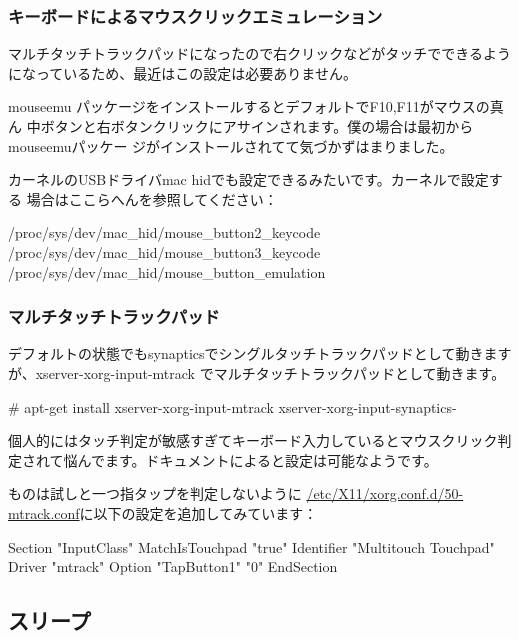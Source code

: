 \documentclass[mingoth,a4paper]{jsarticle}
\begin{document}
\subsubsection{キーボードによるマウスクリックエミュレーション}

マルチタッチトラックパッドになったので右クリックなどがタッチでできるよう
になっているため、最近はこの設定は必要ありません。

mouseemu パッケージをインストールするとデフォルトでF10,F11がマウスの真ん
中ボタンと右ボタンクリックにアサインされます。僕の場合は最初からmouseemuパッケー
ジがインストールされてて気づかずはまりました。

カーネルのUSBドライバmac hidでも設定できるみたいです。カーネルで設定する
場合はここらへんを参照してください：
\begin{commandline}
/proc/sys/dev/mac_hid/mouse_button2_keycode
/proc/sys/dev/mac_hid/mouse_button3_keycode  
/proc/sys/dev/mac_hid/mouse_button_emulation
\end{commandline}

\subsubsection{マルチタッチトラックパッド}

デフォルトの状態でもsynapticsでシングルタッチトラックパッドとして動きますが、xserver-xorg-input-mtrack でマルチタッチトラックパッドとして動きます。 

 \begin{commandline}
# apt-get install xserver-xorg-input-mtrack xserver-xorg-input-synaptics-
 \end{commandline}

個人的にはタッチ判定が敏感すぎてキーボード入力しているとマウスクリック判
定されて悩んでます。ドキュメント\cite{xorg-configure-input,mtrack-doc}によると設定は可能なようです。

ものは試しと一つ指タップを判定しないように
\url{/etc/X11/xorg.conf.d/50-mtrack.conf}に以下の設定を追加してみています：

\begin{commandline}
Section "InputClass"
	MatchIsTouchpad "true"
	Identifier "Multitouch Touchpad"
	Driver "mtrack"
	Option "TapButton1" "0"
EndSection
\end{commandline}


\subsection{スリープ}
\end{document}

